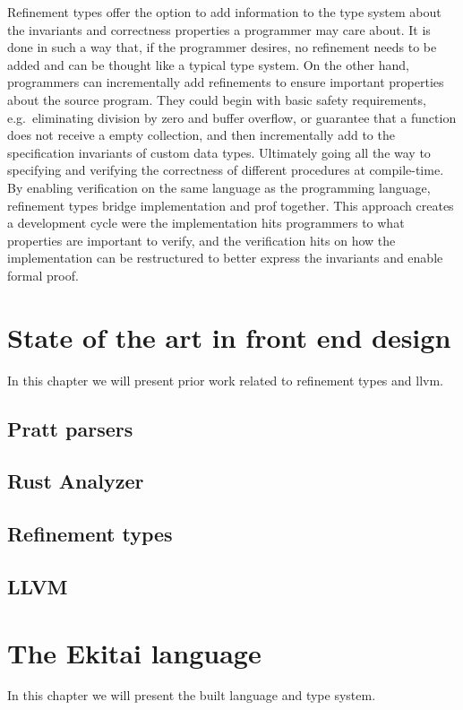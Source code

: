 \documentclass[
    oneside,
    english,
    embeddedlogo,
    noabntexcite
]{ufsc-thesis-rn46-2019}
\begin{document}
Refinement types offer the option to add information to the type system about the invariants and correctness properties a programmer may care about.
It is done in such a way that, if the programmer desires, no refinement needs to be added and can be thought like a typical type system.
On the other hand, programmers can incrementally add refinements to ensure important properties about the source program.
They could begin with basic safety requirements, e.g.\ eliminating division by zero and buffer overflow, or guarantee that a function does not receive a empty collection, and then incrementally add to the specification invariants of custom data types.
Ultimately going all the way to specifying and verifying the correctness of different procedures at compile-time.
By enabling verification on the same language as the programming language, refinement types bridge implementation and prof together.
This approach creates a development cycle were the implementation hits programmers to what properties are important to verify, and the verification hits on how the implementation can be restructured to better express the invariants and enable formal proof.


\chapter{State of the art in front end design}\label{chapter:related_work}

In this chapter we will present prior work related to refinement types and llvm.
\section{Pratt parsers}
\section{Rust Analyzer}
\section{Refinement types}
\section{LLVM}

\chapter{The Ekitai language}\label{chapter:proposal}

In this chapter we will present the built language and type system.
\end{document}
